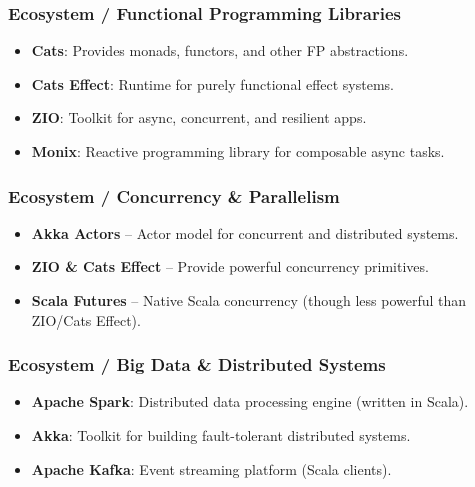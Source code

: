 \documentclass{beamer}
\begin{document}

\begin{frame}
\frametitle{Ecosystem / Functional Programming Libraries }

\begin{itemize}
  \item \textbf{Cats}: Provides monads, functors, and other FP abstractions.
  \item \textbf{Cats Effect}: Runtime for purely functional effect systems.
  \item \textbf{ZIO}: Toolkit for async, concurrent, and resilient apps.
  \item \textbf{Monix}: Reactive programming library for composable async tasks.
\end{itemize}

\end{frame}


\begin{frame}
\frametitle{Ecosystem / Concurrency \& Parallelism }

\begin{itemize}
  \item \textbf{Akka Actors} – Actor model for concurrent and distributed systems.
  \item \textbf{ZIO \& Cats Effect} – Provide powerful concurrency primitives.
  \item \textbf{Scala Futures} – Native Scala concurrency (though less powerful than ZIO/Cats Effect).
\end{itemize}

\end{frame}



\begin{frame}
\frametitle{Ecosystem / Big Data \& Distributed Systems }

\begin{itemize}
  \item \textbf{Apache Spark}: Distributed data processing engine (written in Scala).
  \item \textbf{Akka}: Toolkit for building fault-tolerant distributed systems.
  \item \textbf{Apache Kafka}: Event streaming platform (Scala clients).
\end{itemize}

\end{frame}
\end{document}
